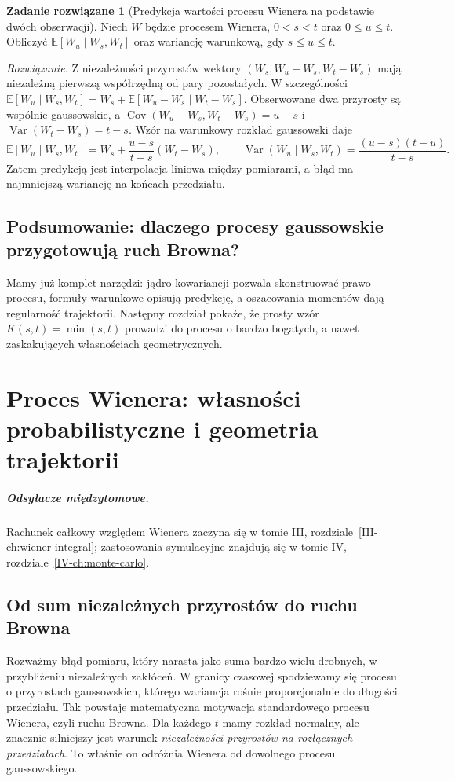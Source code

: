 \documentclass[11pt,a4paper,oneside]{report}
\numberwithin{equation}{chapter}
\theoremstyle{plain}
\theoremstyle{definition}
\newtheorem{zadanie}{Zadanie rozwiązane}[chapter]
\theoremstyle{remark}
\newcommand{\E}{\mathbb{E}}
\newcommand{\Var}{\operatorname{Var}}
\newcommand{\Cov}{\operatorname{Cov}}
\begin{document}
\begin{zadanie}[Predykcja wartości procesu Wienera na podstawie dwóch obserwacji]
Niech $W$ będzie procesem Wienera, $0<s<t$ oraz $0\le u\le t$.
Obliczyć $\E[W_u\mid W_s,W_t]$ oraz wariancję warunkową,
gdy $s\le u\le t$.

\emph{Rozwiązanie.} Z niezależności przyrostów wektory
$(W_s,W_u-W_s,W_t-W_s)$ mają niezależną pierwszą współrzędną
od pary pozostałych. W szczególności
$\E[W_u\mid W_s,W_t]=W_s+\E[W_u-W_s\mid W_t-W_s]$.
Obserwowane dwa przyrosty są wspólnie gaussowskie,
a $\Cov(W_u-W_s,W_t-W_s)=u-s$ i
$\Var(W_t-W_s)=t-s$.
Wzór na warunkowy rozkład gaussowski daje
\[
\E[W_u\mid W_s,W_t]
=W_s+\frac{u-s}{t-s}(W_t-W_s),\qquad
\Var(W_u\mid W_s,W_t)=\frac{(u-s)(t-u)}{t-s}.
\]
Zatem predykcją jest interpolacja liniowa między pomiarami,
a błąd ma najmniejszą wariancję na końcach przedziału.
\end{zadanie}

\section{Podsumowanie: dlaczego procesy gaussowskie przygotowują ruch Browna?}
Mamy już komplet narzędzi: jądro kowariancji pozwala skonstruować
prawo procesu, formuły warunkowe opisują predykcję, a
oszacowania momentów dają regularność trajektorii.
Następny rozdział pokaże, że prosty wzór $K(s,t)=\min(s,t)$
prowadzi do procesu o bardzo bogatych, a nawet zaskakujących
własnościach geometrycznych.

\chapter{Proces Wienera: własności probabilistyczne i geometria trajektorii}
\label{ch:wiener}
\paragraph{Odsyłacze międzytomowe.} Rachunek całkowy względem Wienera zaczyna się w tomie III, rozdziale~\ref{III-ch:wiener-integral}; zastosowania symulacyjne znajdują się w tomie IV, rozdziale~\ref{IV-ch:monte-carlo}.


\section{Od sum niezależnych przyrostów do ruchu Browna}
Rozważmy błąd pomiaru, który narasta jako suma bardzo wielu drobnych,
w przybliżeniu niezależnych zakłóceń. W granicy czasowej spodziewamy
się procesu o przyrostach gaussowskich, którego wariancja rośnie
proporcjonalnie do długości przedziału. Tak powstaje matematyczna
motywacja standardowego procesu Wienera, czyli ruchu Browna.
Dla każdego $t$ mamy rozkład normalny, ale znacznie silniejszy
jest warunek \emph{niezależności przyrostów na rozłącznych
przedziałach}. To właśnie on odróżnia Wienera od dowolnego
procesu gaussowskiego.
\end{document}
